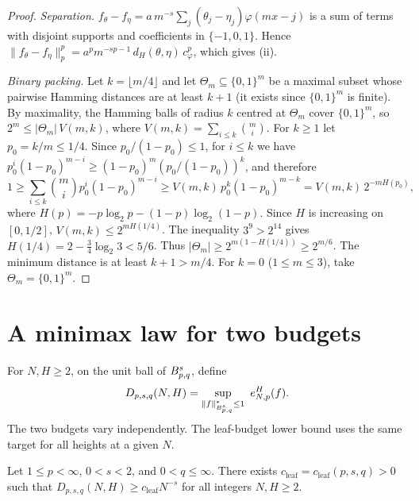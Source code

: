 \documentclass[11pt,a4paper]{article}
\begin{document}
\begin{proof}
\emph{Separation.} $f_\theta-f_\eta=a\,m^{-s}\sum_j(\theta_j-\eta_j)\varphi(mx-j)$ is a sum of terms with disjoint supports and coefficients in $\{-1,0,1\}$. Hence $\|f_\theta-f_\eta\|_p^p=a^pm^{-sp-1}\,d_H(\theta,\eta)\,c_\varphi^p$, which gives (ii).

\emph{Binary packing.} Let $k=\lfloor m/4\rfloor$ and let $\Theta_m\subseteq\{0,1\}^m$ be a maximal subset whose pairwise Hamming distances are at least $k+1$ (it exists since $\{0,1\}^m$ is finite). By maximality, the Hamming balls of radius $k$ centred at $\Theta_m$ cover $\{0,1\}^m$, so $2^m\le|\Theta_m|\,V(m,k)$, where $V(m,k)=\sum_{i\le k}\binom mi$. For $k\ge1$ let $p_0=k/m\le1/4$. Since $p_0/(1-p_0)\le1$, for $i\le k$ we have $p_0^i(1-p_0)^{m-i}\ge(1-p_0)^m(p_0/(1-p_0))^k$, and therefore
\[
1\ge\sum_{i\le k}\binom mi p_0^i(1-p_0)^{m-i}\ge V(m,k)\,p_0^k(1-p_0)^{m-k}=V(m,k)\,2^{-mH(p_0)},
\]
where $H(p)=-p\log_2p-(1-p)\log_2(1-p)$. Since $H$ is increasing on $[0,1/2]$, $V(m,k)\le2^{mH(1/4)}$. The inequality $3^9>2^{14}$ gives $H(1/4)=2-\frac34\log_2 3<5/6$. Thus $|\Theta_m|\ge2^{m(1-H(1/4))}\ge2^{m/6}$. The minimum distance is at least $k+1>m/4$. For $k=0$ ($1\le m\le3$), take $\Theta_m=\{0,1\}^m$.
\end{proof}

\section{A minimax law for two budgets}
\label{lp:sec:minimax}

For $N,H\ge2$, on the unit ball of $B^{s}_{p,q}$, define
\[
 D_{p,s,q}(N,H)=\sup_{\|f\|^*_{\Bes{s}{p}{q}}\le1}\ e^H_{N,p}(f).
\]
The two budgets vary independently. The leaf-budget lower bound uses the same target for all heights at a given $N$.

\begin{lema}
\label{lp:lem:leaf-budget-floor}
Let $1\le p<\infty$, $0<s<2$, and $0<q\le\infty$. There exists $c_{\mathrm{leaf}}=c_{\mathrm{leaf}}(p,s,q)>0$ such that $D_{p,s,q}(N,H)\ge c_{\mathrm{leaf}}N^{-s}$ for all integers $N,H\ge2$.
\end{lema}
\end{document}
